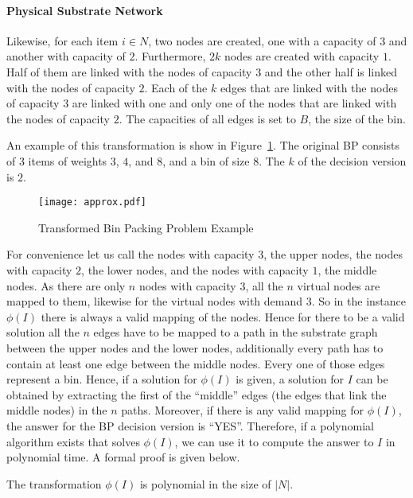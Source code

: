 \paragraph{Physical Substrate Network} Likewise, for each item $i \in N$, two nodes are created, one with a capacity of $3$ and another with capacity of $2$. Furthermore, $2k$ nodes are created with capacity $1$. Half of them are linked with the nodes of capacity $3$ and the other half is linked with the nodes of capacity $2$. Each of the $k$ edges that are linked with the nodes of capacity $3$ are linked with one and only one of the nodes that are linked with the nodes of capacity $2$. The capacities of all edges is set to $B$, the size of the bin.

An example of this transformation is show in Figure~\ref{fig:trans}. The original BP consists of $3$ items of weights $3$, $4$, and $8$, and a bin of size $8$. The $k$ of the decision version is $2$.

\begin{figure}[h]
  \centering
  \texttt{[image: approx.pdf]}
  \caption{Transformed Bin Packing Problem Example}\label{fig:trans}
\end{figure}

For convenience let us call the nodes with capacity $3$, the upper nodes, the nodes with capacity $2$, the lower nodes, and the nodes with capacity $1$, the middle nodes. As there are only $n$ nodes with capacity $3$, all the $n$ virtual nodes are mapped to them, likewise for the virtual nodes with demand $3$. So in the instance $\phi(I)$ there is always a valid mapping of the nodes. Hence for there to be a valid solution all the $n$ edges have to be mapped to a path in the substrate graph between the upper nodes and the lower nodes, additionally every path has to contain at least one edge between the middle nodes. Every one of those edges represent a bin. Hence, if a solution for $\phi(I)$ is given, a solution for $I$ can be obtained by extracting the first of the ``middle'' edges (the edges that link the middle nodes) in the $n$ paths. Moreover, if there is any valid mapping for $\phi(I)$, the answer for the BP decision version is ``YES''. Therefore, if a polynomial algorithm exists that solves $\phi(I)$, we can use it to compute the answer to $I$ in polynomial time. A formal proof is given below.

\begin{lemma} \label{lem:transpol}
  The transformation $\phi(I)$ is polynomial in the size of $|N|$.
\end{lemma}

